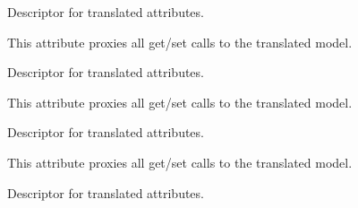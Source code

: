 \documentclass[letterpaper,10pt,french]{sphinxmanual}
\begin{document}
\begin{fulllineitems}
\begin{fulllineitems}
\end{fulllineitems}


\begin{fulllineitems}
\label{\detokenize{index:core.models.FoodInfo.bar_hours_end}}
\pysigstartsignatures
\pysigline
{}
\pysigstopsignatures
\sphinxAtStartPar
Descriptor for translated attributes.

\sphinxAtStartPar
This attribute proxies all get/set calls to the translated model.

\end{fulllineitems}


\begin{fulllineitems}
\label{\detokenize{index:core.models.FoodInfo.bar_hours_start}}
\pysigstartsignatures
\pysigline
{}
\pysigstopsignatures
\sphinxAtStartPar
Descriptor for translated attributes.

\sphinxAtStartPar
This attribute proxies all get/set calls to the translated model.

\end{fulllineitems}


\begin{fulllineitems}
\label{\detokenize{index:core.models.FoodInfo.bread_hours_end}}
\pysigstartsignatures
\pysigline
{}
\pysigstopsignatures
\sphinxAtStartPar
Descriptor for translated attributes.

\sphinxAtStartPar
This attribute proxies all get/set calls to the translated model.

\end{fulllineitems}


\begin{fulllineitems}
\label{\detokenize{index:core.models.FoodInfo.bread_hours_reservations}}
\pysigstartsignatures
\pysigline
{}
\pysigstopsignatures
\sphinxAtStartPar
Descriptor for translated attributes.


\end{fulllineitems}
\end{fulllineitems}
\end{document}
